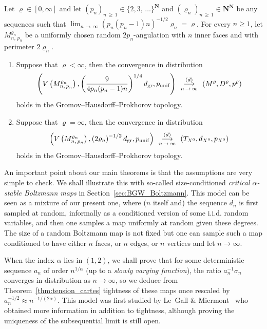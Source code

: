 \documentclass[10pt]{amsart}
\theoremstyle{definition}\newtheorem{defi}[theo]{Definition}\newtheorem{rema}[theo]{Remark}\newtheorem{exam}[theo]{Example}\newtheorem{exem}[theo]{Example}\newtheorem{nota}[theo]{Notation}
\newcommand{\ensembles}[1]{\mathbf{#1}}
\newcommand{\N}{\ensembles{N}}
\newcommand{\1}{\ensembles{1}}
\renewcommand{\ge}{\geqslant}
\newcommand{\Bmap}{M}
\newcommand{\dBmap}{D}
\newcommand{\pBmap}{p}
\newcommand{\CRT}{T}
\newcommand{\dCRT}{d}
\newcommand{\pCRT}{p}
\newcommand{\dgr}{d_{\mathrm{gr}}}
\newcommand{\pgr}{p_{\mathrm{unif}}}
\newcommand{\cvloi}[1][n]{\enskip\mathop{\longrightarrow}^{(d)}_{#1\,\to\, \infty}\enskip}
\providecommand{\?}{}
\begin{document}
\begin{coro}\label{cor:convergence_d_ang}
Let $\varrho \in [0,\infty]$ and let $(p_n)_{n\,\ge\,1} \in \{2, 3,\,\dots\}^\N$ and $(\varrho_n)_{n\,\ge\,1} \in \N^\N$ be any sequences such that $\lim_{n\,\to\,\infty} (p_n (p_n-1) n)^{-1/2} \varrho_n = \varrho$. For every $n \ge 1$, let $M^{\varrho_n}_{n,\, p_n}$ be a uniformly chosen random $2p_n$-angulation with $n$ inner faces and with perimeter $2\varrho_n$.
\begin{enumerate}
\item Suppose that $\varrho < \infty$, then the convergence in distribution
\[
\left(V\left(M^{\varrho_n}_{n,\,p_n}\right), \left(\frac{9}{4 p_n (p_n-1) n}\right)^{1/4} \dgr, \pgr\right) \cvloi \left(\Bmap^\varrho,\dBmap^\varrho, \pBmap^\varrho\right)
\]
holds in the Gromov--Hausdorff--Prokhorov topology.

\item Suppose that $\varrho = \infty$, then the convergence in distribution
\[
\left(V\left(M^{\varrho_n}_{n,\,p_n}\right), \left(2\varrho_n\right)^{-1/2} \dgr, \pgr\right) \cvloi \left(\CRT_{X^0}, \dCRT_{X^0}, \pCRT_{X^0}\right)
\]
holds in the Gromov--Hausdorff--Prokhorov topology.
\end{enumerate}
\end{coro}



An important point about our main theorems is that the assumptions are very simple to check. We shall illustrate this with so-called size-conditioned \emph{critical $\alpha$-stable Boltzmann maps} in Section~\ref{sec:BGW_Boltzmann}. This model can be seen as a mixture of our present one, where ($n$ itself and) the sequence $d_n$ is first sampled at random, informally as a conditioned version of some i.i.d. random variables, and then one samples a map uniformly at random given these degrees. The size of a random Boltzmann map is not fixed but one can sample such a map conditioned to have either $n$ faces, or $n$ edges, or $n$ vertices and let $n \to \infty$.

When the index $\alpha$ lies in $(1,2)$, we shall prove that for some deterministic sequence $a_n$ of order $n^{1/\alpha}$ (up to a \emph{slowly varying function}), the ratio $a_n^{-1} \sigma_n$ converges in distribution as $n\to\infty$, so we deduce from Theorem~\ref{thm:tension_cartes} tightness of these maps once rescaled by $a_n^{-1/2} \approx n^{-1/(2\alpha)}$. This model was first studied by Le~Gall \& Miermont~\cite{LGM11} who obtained more information in addition to tightness, although proving the uniqueness of the subsequential limit is still open.
\end{document}
